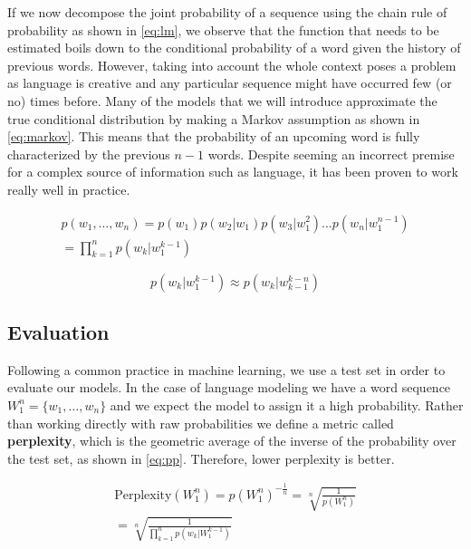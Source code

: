 If we now decompose the joint probability of a sequence using the chain rule of probability as shown in \autoref{eq:lm}, we observe that the function that needs to be estimated boils down to the conditional probability of a word given the history of previous words. However, taking into account the whole context poses a problem as language is creative and any particular sequence might have occurred few (or no) times before.  Many of the models that we will introduce approximate the true conditional distribution by making a Markov assumption as shown in \autoref{eq:markov}. This means that the probability of an upcoming word is fully characterized by the previous $n-1$ words. Despite seeming an incorrect premise for a complex source of information such as language, it has been proven to work really well in practice.

\begin{equation} \label{eq:lm}
	\begin{gathered}
		p(w_1, \ldots ,w_n)=p(w_1)p(w_2|w_1)p(w_3|w_{1}^{2}) \ldots p(w_n|w_{1}^{n-1}) \\
		= \prod_{k=1}^{n} p(w_k|w_{1}^{k-1})
	\end{gathered}
\end{equation}

\begin{equation} \label{eq:markov}
	p(w_k|w_{1}^{k-1}) \approx p(w_k|w_{k-1}^{k-n})
\end{equation}

\subsection{Evaluation}

Following a common practice in machine learning, we use a test set in order to evaluate our models. In the case of language modeling we have a word sequence $W_1^n=\{w_1, \ldots , w_n\}$ and we expect the model to assign it a high probability. Rather than working directly with raw probabilities we define a metric called \textbf{perplexity}, which is the geometric average of the inverse of the probability over the test set, as shown in \autoref{eq:pp}. Therefore, lower perplexity is better.

\begin{equation} \label{eq:pp}
	\begin{gathered}
		\text{Perplexity}(W_1^n) = p(W_1^n)^{-\frac{1}{n}} = \sqrt[n]{\frac{1}{p(W_1^n)}} \\
		= \sqrt[n]{\frac{1}{\prod_{k=1}^{n} p(w_k|W_{1}^{k-1})}}
	\end{gathered}
\end{equation}

